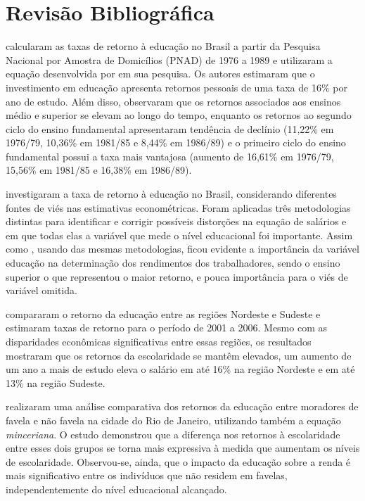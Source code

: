 \documentclass[12pt,a4paper,header]{abnt}
\begin{document}
\section{Revisão Bibliográfica}
 calcularam as taxas de retorno à educação no Brasil a partir da Pesquisa Nacional por Amostra de Domicílios (PNAD) de 1976 a 1989 e utilizaram a equação desenvolvida por  em sua pesquisa. Os autores estimaram que o investimento em educação apresenta retornos pessoais de uma taxa de 16\% por ano de estudo. Além disso, observaram que os retornos associados aos ensinos médio e superior se elevam ao longo do tempo, enquanto os retornos ao segundo ciclo do ensino fundamental apresentaram tendência de declínio (11,22\% em 1976/79, 10,36\% em 1981/85 e 8,44\% em 1986/89) e o primeiro ciclo do ensino fundamental possui a taxa mais vantajosa (aumento de 16,61\% em 1976/79, 15,56\% em 1981/85 e 16,38\% em 1986/89).

 investigaram a taxa de retorno à educação no Brasil, considerando diferentes fontes de viés nas estimativas econométricas. Foram aplicadas três metodologias distintas para identificar e corrigir possíveis distorções na equação de salários e em que todas elas a variável que mede o nível educacional foi importante. Assim como , usando das mesmas metodologias, ficou evidente a importância da variável educação na determinação dos rendimentos dos trabalhadores, sendo o ensino superior o que representou o maior retorno, e pouca importância para o viés de variável omitida.

 compararam o retorno da educação entre as regiões Nordeste e Sudeste e estimaram taxas de retorno para o período de 2001 a 2006. Mesmo com as disparidades econômicas significativas entre essas regiões, os resultados mostraram que os retornos da escolaridade se mantêm elevados, um aumento de um ano a mais de estudo eleva o salário em até 16\% na região Nordeste e em até 13\% na região Sudeste.

 realizaram uma análise comparativa dos retornos da educação entre moradores de favela e não favela na cidade do Rio de Janeiro, utilizando também a equação \textit{minceriana}. O estudo demonstrou que a diferença nos retornos à escolaridade entre esses dois grupos se torna mais expressiva à medida que aumentam os níveis de escolaridade. Observou-se, ainda, que o impacto da educação sobre a renda é mais significativo entre os indivíduos que não residem em favelas, independentemente do nível educacional alcançado.
\end{document}
